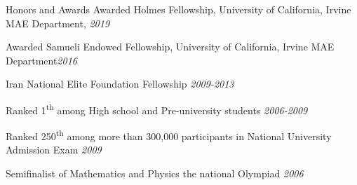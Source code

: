\begin{rSection}{Honors and Awards}
Awarded Holmes Fellowship, University of California, Irvine MAE Department, \hfill {\em 2019}

Awarded Samueli Endowed Fellowship, University of California, Irvine MAE Department\hfill {\em 2016}

Iran National Elite Foundation Fellowship \hfill {\em 2009-2013}

Ranked 1\textsuperscript{th} among High school and Pre-university students \hfill {\em 2006-2009}

Ranked 250\textsuperscript{th} among more than 300,000 participants in National University Admission Exam \hfill {\em 2009}

Semifinalist of Mathematics and Physics the national Olympiad \hfill {\em 2006}

\end{rSection}